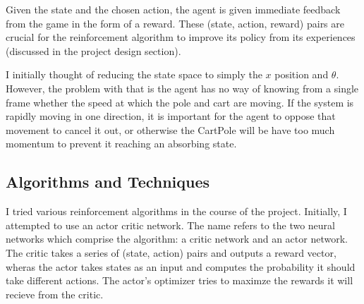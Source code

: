 \documentclass[12pt,a4paper]{article}
\begin{document}
Given the state and the chosen action, the agent is given immediate feedback from the game in the form of a reward. These (state, action, reward) pairs are crucial for the reinforcement algorithm to improve its policy from its experiences (discussed in the project design section).

I initially thought of reducing the state space to simply the $x$ position and $\theta$. However, the problem with that is the agent has no way of knowing from a single frame whether the speed at which the pole and cart are moving. If the system is rapidly moving in one direction, it is important for the agent to oppose that movement to cancel it out, or otherwise the CartPole will be have too much momentum to prevent it reaching an absorbing state.


%
\subsection*{Algorithms and Techniques}

I tried various reinforcement algorithms in the course of the project. Initially, I attempted to use an actor critic network. The name refers to the two neural networks which comprise the algorithm: a critic network and an actor network. The critic takes a series of (state, action) pairs and outputs a reward vector, wheras the actor takes states as an input and computes the probability it should take different actions. The actor's optimizer tries to maximze the rewards it will recieve from the critic. 
\end{document}
